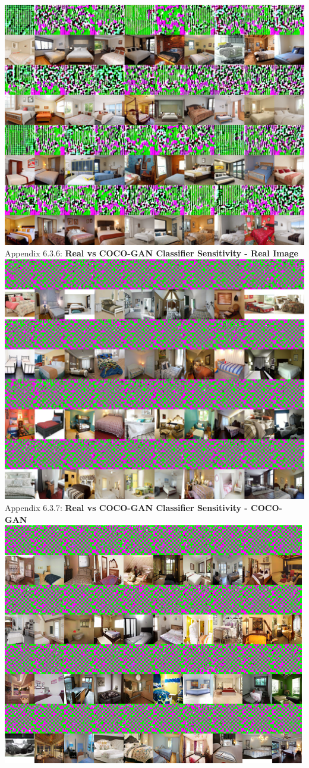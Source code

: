 \documentclass[10pt]{article}
\begin{document}
    \includegraphics[scale=1.05]{smoothgrad-big/stylegan_model/testing-2-2-combined-dataset-stylegan-smoothgrad.png}\\
    Appendix 6.3.6: \textbf{Real vs COCO-GAN Classifier Sensitivity - Real Image}\\
    \includegraphics[scale=1.05]{smoothgrad-big/cocogan_model/testing-2-2-combined-dataset-raw-smoothgrad.png}
    \newpage
    Appendix 6.3.7: \textbf{Real vs COCO-GAN Classifier Sensitivity - COCO-GAN}\\
    \includegraphics[scale=1.05]{smoothgrad-big/cocogan_model/testing-2-2-combined-dataset-cocogan-smoothgrad.png}
\end{document}
